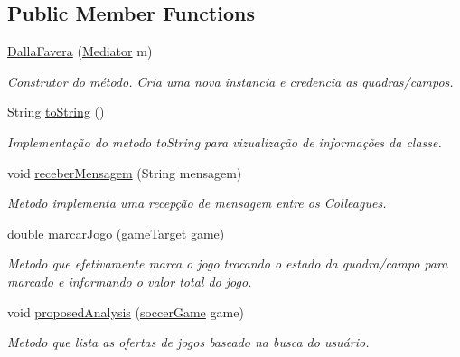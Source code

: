 \subsection*{Public Member Functions}
\begin{DoxyCompactItemize}
\item 
\mbox{\hyperlink{classmediator_pattern_1_1_dalla_favera_a9c66c302dff8edae02fa7964c62c4596}{Dalla\+Favera}} (\mbox{\hyperlink{interfacemediator_pattern_1_1_mediator}{Mediator}} m)
\begin{DoxyCompactList}\small\item\em Construtor do método. Cria uma nova instancia e credencia as quadras/campos. \end{DoxyCompactList}\item 
String \mbox{\hyperlink{classmediator_pattern_1_1_dalla_favera_a7b255e14ecacd6f0bb0e5658ad26437d}{to\+String}} ()
\begin{DoxyCompactList}\small\item\em Implementação do metodo to\+String para vizualização de informações da classe. \end{DoxyCompactList}\item 
void \mbox{\hyperlink{classmediator_pattern_1_1_dalla_favera_a96c0fbf7e2f33a3b8176c1993f6cf8e2}{receber\+Mensagem}} (String mensagem)
\begin{DoxyCompactList}\small\item\em Metodo implementa uma recepção de mensagem entre os Colleagues. \end{DoxyCompactList}\item 
double \mbox{\hyperlink{classmediator_pattern_1_1_dalla_favera_a56aacf69df5457b341d5bd0a4b3164eb}{marcar\+Jogo}} (\mbox{\hyperlink{interfaceadapter_pattern_1_1game_target}{game\+Target}} game)
\begin{DoxyCompactList}\small\item\em Metodo que efetivamente marca o jogo trocando o estado da quadra/campo para marcado e informando o valor total do jogo. \end{DoxyCompactList}\item 
void \mbox{\hyperlink{classmediator_pattern_1_1_dalla_favera_a2c916582524a756d23c263b62335b432}{proposed\+Analysis}} (\mbox{\hyperlink{classtemplate_pattern_1_1soccer_game}{soccer\+Game}} game)
\begin{DoxyCompactList}\small\item\em Metodo que lista as ofertas de jogos baseado na busca do usuário. \end{DoxyCompactList}\end{DoxyCompactItemize}
